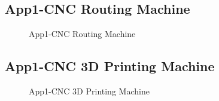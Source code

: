 \clearpage
\pagebreak
\subsection{App1-CNC Routing Machine}
\begin{figure}[htbp]
	\begin{center}
		\caption{App1-CNC Routing Machine}
		\label{fig:App1-CNC-Routing-Machine.jpg}
	\end{center}
\end{figure}

\subsection{App1-CNC 3D Printing Machine}
\begin{figure}[htbp]
	\begin{center}
		\caption{App1-CNC 3D Printing Machine}
		\label{fig:App1-CNC-3D-Printing-Machine.jpg}
	\end{center}
\end{figure}

